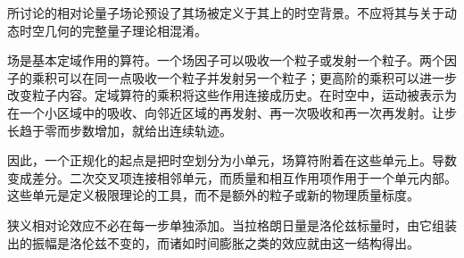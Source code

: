 \begin{classroomqa}
\end{classroomqa}

所讨论的相对论量子场论预设了其场被定义于其上的时空背景。不应将其与关于动态时空几何的完整量子理论相混淆。

\begin{classroomqa}
\end{classroomqa}

场是基本定域作用的算符。一个场因子可以吸收一个粒子或发射一个粒子。两个因子的乘积可以在同一点吸收一个粒子并发射另一个粒子；更高阶的乘积可以进一步改变粒子内容。定域算符的乘积将这些作用连接成历史。在时空中，运动被表示为在一个小区域中的吸收、向邻近区域的再发射、再一次吸收和再一次再发射。让步长趋于零而步数增加，就给出连续轨迹。

\begin{classroomqa}
\end{classroomqa}

因此，一个正规化的起点是把时空划分为小单元，场算符附着在这些单元上。导数变成差分。二次交叉项连接相邻单元，而质量和相互作用项作用于一个单元内部。这些单元是定义极限理论的工具，而不是额外的粒子或新的物理质量标度。

狭义相对论效应不必在每一步单独添加。当拉格朗日量是洛伦兹标量时，由它组装出的振幅是洛伦兹不变的，而诸如时间膨胀之类的效应就由这一结构得出。

\begin{classroomqa}
\end{classroomqa}

